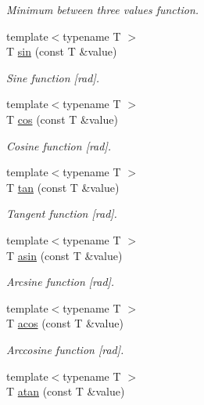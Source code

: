 \begin{DoxyCompactItemize}
\begin{DoxyCompactList}\small\item\em Minimum between three values function. \end{DoxyCompactList}\item 
{\footnotesize template$<$typename T $>$ }\\T \hyperlink{namespaceacme_a47c0b8f84e101492adfb8567e85214d9}{sin} (const T \&value)
\begin{DoxyCompactList}\small\item\em Sine function \mbox{[}rad\mbox{]}. \end{DoxyCompactList}\item 
{\footnotesize template$<$typename T $>$ }\\T \hyperlink{namespaceacme_ae74481d6a235be6f194a86ade7719e5c}{cos} (const T \&value)
\begin{DoxyCompactList}\small\item\em Cosine function \mbox{[}rad\mbox{]}. \end{DoxyCompactList}\item 
{\footnotesize template$<$typename T $>$ }\\T \hyperlink{namespaceacme_a0fa0c6c9aef80a18fe865938fa2cb01d}{tan} (const T \&value)
\begin{DoxyCompactList}\small\item\em Tangent function \mbox{[}rad\mbox{]}. \end{DoxyCompactList}\item 
{\footnotesize template$<$typename T $>$ }\\T \hyperlink{namespaceacme_a8c712ed5d1336fab688be5cd7c6afd07}{asin} (const T \&value)
\begin{DoxyCompactList}\small\item\em Arcsine function \mbox{[}rad\mbox{]}. \end{DoxyCompactList}\item 
{\footnotesize template$<$typename T $>$ }\\T \hyperlink{namespaceacme_a9ea04b104383cbb01ba4b6bc8fbd1823}{acos} (const T \&value)
\begin{DoxyCompactList}\small\item\em Arccosine function \mbox{[}rad\mbox{]}. \end{DoxyCompactList}\item 
{\footnotesize template$<$typename T $>$ }\\T \hyperlink{namespaceacme_ab9d8ecb26b9bc01ea9e8906489d709bf}{atan} (const T \&value)

\end{DoxyCompactItemize}

